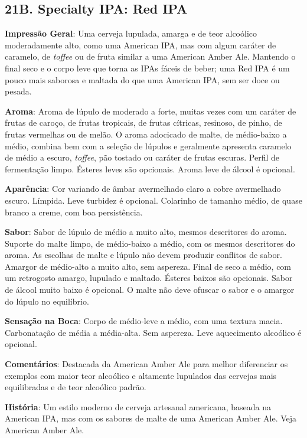 \subsection*{21B. Specialty IPA: Red IPA}
\textbf{Impressão Geral}: Uma cerveja lupulada, amarga e de teor alcoólico moderadamente alto, como uma American IPA, mas com algum caráter de caramelo, de \textit{toffee} ou de fruta similar a uma American Amber Ale. Mantendo o final seco e o corpo leve que torna as IPAs fáceis de beber; uma Red IPA é um pouco mais saborosa e maltada do que uma American IPA, sem ser doce ou pesada.

\textbf{Aroma}: Aroma de lúpulo de moderado a forte, muitas vezes com um caráter de frutas de caroço, de frutas tropicais, de frutas cítricas, resinoso, de pinho, de frutas vermelhas ou de melão. O aroma adocicado de malte, de médio-baixo a médio, combina bem com a seleção de lúpulos e geralmente apresenta caramelo de médio a escuro, \textit{toffee}, pão tostado ou caráter de frutas escuras. Perfil de fermentação limpo. Ésteres leves são opcionais. Aroma leve de álcool é opcional.

\textbf{Aparência}: Cor variando de âmbar avermelhado claro a cobre avermelhado escuro. Límpida. Leve turbidez é opcional. Colarinho de tamanho médio, de quase branco a creme, com boa persistência.

\textbf{Sabor}: Sabor de lúpulo de médio a muito alto, mesmos descritores do aroma. Suporte do malte limpo, de médio-baixo a médio, com os mesmos descritores do aroma. As escolhas de malte e lúpulo não devem produzir conflitos de sabor. Amargor de médio-alto a muito alto, sem aspereza. Final de seco a médio, com um retrogosto amargo, lupulado e maltado. Ésteres baixos são opcionais. Sabor de álcool muito baixo é opcional. O malte não deve ofuscar o sabor e o amargor do lúpulo no equilíbrio.

\textbf{Sensação na Boca}: Corpo de médio-leve a médio, com uma textura macia. Carbonatação de média a média-alta. Sem aspereza. Leve aquecimento alcoólico é opcional.

\textbf{Comentários}: Destacada da American Amber Ale para melhor diferenciar os exemplos com maior teor alcoólico e altamente lupulados das cervejas mais equilibradas e de teor alcoólico padrão.

\textbf{História}: Um estilo moderno de cerveja artesanal americana, baseada na American IPA, mas com os sabores de malte de uma American Amber Ale. Veja American Amber Ale.


